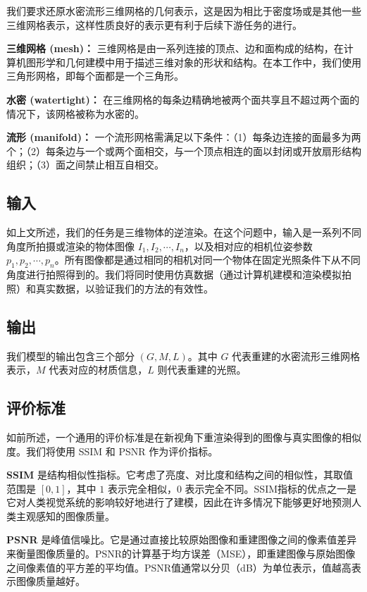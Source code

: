 我们要求还原水密流形三维网格的几何表示，这是因为相比于密度场或是其他一些三维网格表示，这样性质良好的表示更有利于后续下游任务的进行。

\textbf{三维网格 (mesh)：} 三维网格是由一系列连接的顶点、边和面构成的结构，在计算机图形学和几何建模中用于描述三维对象的形状和结构。在本工作中，我们使用三角形网格，即每个面都是一个三角形。

\textbf{水密 (watertight)：} 在三维网格的每条边精确地被两个面共享且不超过两个面的情况下，该网格被称为水密的。

\textbf{流形 (manifold)：} 一个流形网格需满足以下条件：（1）每条边连接的面最多为两个；（2）每条边与一个或两个面相交，与一个顶点相连的面以封闭或开放扇形结构组织；（3）面之间禁止相互自相交。

\subsection*{输入}
如上文所述，我们的任务是三维物体的逆渲染。在这个问题中，输入是一系列不同角度所拍摄或渲染的物体图像 $I_1, I_2, \cdots, I_n$，以及相对应的相机位姿参数 $p_1, p_2, \cdots, p_n$。所有图像都是通过相同的相机对同一个物体在固定光照条件下从不同角度进行拍照得到的。我们将同时使用仿真数据（通过计算机建模和渲染模拟拍照）和真实数据，以验证我们的方法的有效性。

\subsection*{输出}
我们模型的输出包含三个部分 $(G, M, L)$。其中 $G$ 代表重建的水密流形三维网格表示，$M$ 代表对应的材质信息，$L$ 则代表重建的光照。

\subsection*{评价标准}
如前所述，一个通用的评价标准是在新视角下重渲染得到的图像与真实图像的相似度。我们将使用 SSIM 和 PSNR 作为评价指标。

\textbf{SSIM} 是结构相似性指标。它考虑了亮度、对比度和结构之间的相似性，其取值范围是 $[0,1]$，其中 $1$ 表示完全相似，$0$ 表示完全不同。SSIM指标的优点之一是它对人类视觉系统的影响较好地进行了建模，因此在许多情况下能够更好地预测人类主观感知的图像质量。

\textbf{PSNR} 是峰值信噪比。它是通过直接比较原始图像和重建图像之间的像素值差异来衡量图像质量的。PSNR的计算基于均方误差（MSE），即重建图像与原始图像之间像素值的平方差的平均值。PSNR值通常以分贝（dB）为单位表示，值越高表示图像质量越好。

